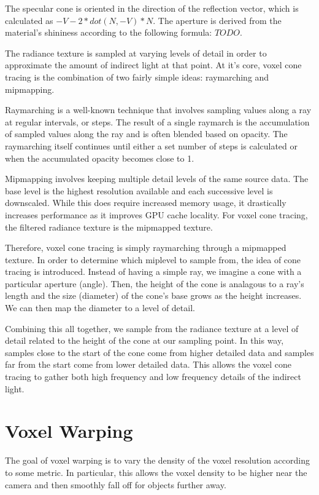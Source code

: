 The specular cone is oriented in the direction of the reflection vector, which is calculated as $-V - 2 * dot(N, -V) * N$. The aperture is derived from the material's shininess according to the following formula: $TODO$.

The radiance texture is sampled at varying levels of detail in order to approximate the amount of indirect light at that point. At it's core, voxel cone tracing is the combination of two fairly simple ideas: raymarching and mipmapping.

Raymarching is a well-known technique that involves sampling values along a ray at regular intervals, or steps. The result of a single raymarch is the accumulation of sampled values along the ray and is often blended based on opacity. The raymarching itself continues until either a set number of steps is calculated or when the accumulated opacity becomes close to 1.

Mipmapping involves keeping multiple detail levels of the same source data. The base level is the highest resolution available and each successive level is downscaled. While this does require increased memory usage, it drastically increases performance as it improves GPU cache locality. For voxel cone tracing, the filtered radiance texture is the mipmapped texture.

Therefore, voxel cone tracing is simply raymarching through a mipmapped texture. In order to determine which miplevel to sample from, the idea of cone tracing is introduced. Instead of having a simple ray, we imagine a cone with a particular aperture (angle). Then, the height of the cone is analagous to a ray's length and the size (diameter) of the cone's base grows as the height increases. We can then map the diameter to a level of detail.

Combining this all together, we sample from the radiance texture at a level of detail related to the height of the cone at our sampling point. In this way, samples close to the start of the cone come from higher detailed data and samples far from the start come from lower detailed data. This allows the voxel cone tracing to gather both high frequency and low frequency details of the indirect light.

\section{Voxel Warping}
The goal of voxel warping is to vary the density of the voxel resolution according to some metric. In particular, this allows the voxel density to be higher near the camera and then smoothly fall off for objects further away.

